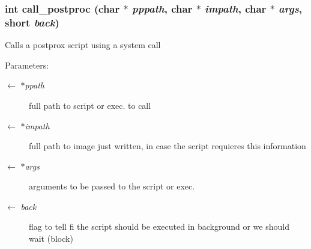 \subsubsection{\setlength{\rightskip}{0pt plus 5cm}int call\_\-postproc (char $\ast$ {\em pppath}, char $\ast$ {\em impath}, char $\ast$ {\em args}, short {\em back})}\label{GfitsPPLib_8c_b67ca8073ef7434ada6f93e84f4b67ef}


Calls a postprox script using a system call \begin{Desc}
\item[Parameters:]
\begin{description}
\item[\mbox{$\leftarrow$} {\em $\ast$ppath}]full path to script or exec. to call \item[\mbox{$\leftarrow$} {\em $\ast$impath}]full path to image just written, in case the script requieres this information \item[\mbox{$\leftarrow$} {\em $\ast$args}]arguments to be passed to the script or exec. \item[\mbox{$\leftarrow$} {\em back}]flag to tell fi the script should be executed in background or we should wait (block) \end{description}
\end{Desc}
